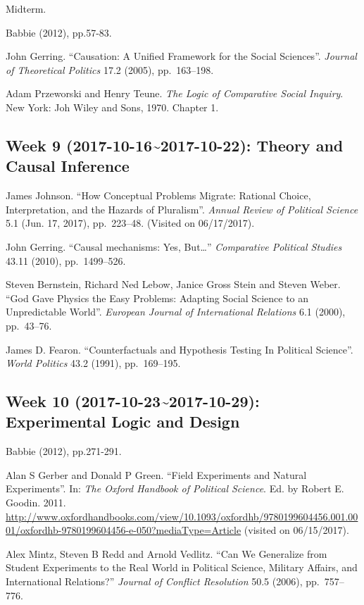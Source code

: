 \documentclass[11pt,]{article}
\theoremstyle{definition}
\theoremstyle{definition}
\theoremstyle{remark}
\begin{document}
Midterm.

Babbie (2012), pp.57-83.

John Gerring. ``Causation: A Unified Framework for the Social
Sciences''. \emph{Journal of Theoretical Politics} 17.2 (2005),
pp.~163--198.

Adam Przeworski and Henry Teune.
\emph{The Logic of Comparative Social Inquiry}. New York: Joh Wiley and
Sons, 1970. Chapter 1.

\subsection{Week 9 (2017-10-16\textasciitilde{}2017-10-22): Theory and
Causal
Inference}\label{week-9-2017-10-162017-10-22-theory-and-causal-inference}

James Johnson. ``How Conceptual Problems Migrate: Rational Choice,
Interpretation, and the Hazards of Pluralism''.
\emph{Annual Review of Political Science} 5.1 (Jun. 17, 2017),
pp.~223--48. (Visited on 06/17/2017).

John Gerring. ``Causal mechanisms: Yes, But\ldots{}''
\emph{Comparative Political Studies} 43.11 (2010), pp.~1499--526.

Steven Bernstein, Richard Ned Lebow, Janice Gross Stein and Steven
Weber. ``God Gave Physics the Easy Problems: Adapting Social Science to
an Unpredictable World''.
\emph{European Journal of International Relations} 6.1 (2000),
pp.~43--76.

James D. Fearon. ``Counterfactuals and Hypothesis Testing In Political
Science''. \emph{World Politics} 43.2 (1991), pp.~169--195.

\subsection{Week 10 (2017-10-23\textasciitilde{}2017-10-29):
Experimental Logic and
Design}\label{week-10-2017-10-232017-10-29-experimental-logic-and-design}

Babbie (2012), pp.271-291.

Alan S Gerber and Donald P Green. ``Field Experiments and Natural
Experiments''. In: \emph{The Oxford Handbook of Political Science}. Ed.
by Robert E. Goodin. 2011.
\url{http://www.oxfordhandbooks.com/view/10.1093/oxfordhb/9780199604456.001.0001/oxfordhb-9780199604456-e-050?mediaType=Article}
(visited on 06/15/2017).

Alex Mintz, Steven B Redd and Arnold Vedlitz. ``Can We Generalize from
Student Experiments to the Real World in Political Science, Military
Affairs, and International Relations?''
\emph{Journal of Conflict Resolution} 50.5 (2006), pp.~757--776.
\end{document}
